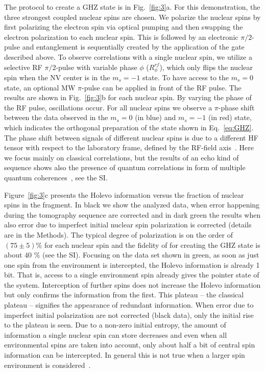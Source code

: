 \documentclass[aps,prl,floatfix,twocolumn,footinbib,superscriptaddress]{revtex4-1}
\begin{document}
The protocol to create a GHZ state is in Fig.~\ref{fig:3}a. For this demonstration, the three strongest coupled nuclear spins are chosen. We polarize the nuclear spins by first polarizing the electron spin via optical pumping and then swapping the electron polarization to each nuclear spin. This is followed by an electronic $\pi/2$-pulse and entanglement is sequentially created by the application of the gate described above. To observe correlations with a single nuclear spin, we utilize a selective RF $\pi/2$-pulse with variable phase $\phi$ ($R^{rf}_\phi$), which only flips the nuclear spin when the NV center is in the $m_s = -1$ state. To have access to the $m_s=0$ state, an optional MW $\pi$-pulse can be applied in front of the RF pulse. The results are shown in Fig.~\ref{fig:3}b for each nuclear spin. By varying the phase of the RF pulse, oscillations occur. For all nuclear spins we observe a $\pi$-phase shift between the data observed in the $m_s = 0$ (in blue) and $m_s = -1$ (in red) state, which indicates the orthogonal preparation of the state shown in Eq.~\eqref{eq:GHZ}. The phase shift between signals of different nuclear spins is due to a different HF tensor with respect to the laboratory frame, defined by the RF-field axis~\cite{Laraoui15}. Here we focus mainly on classical correlations, but the results of an echo kind of sequence shows also the presence of quantum correlations in form of multiple quantum coherences~\cite{Baum85,Gaerttner17}, see the SI.  

Figure~\ref{fig:3}c presents the Holevo information versus the fraction of nuclear spins in the fragment. In black we show the analyzed data, when error happening during the tomography sequence are corrected and in dark green the results when also error due to imperfect initial nuclear spin polarization is corrected (details are in the Methods). The typical degree of polarization is on the order of $(75\pm 5) \%$ for each nuclear spin and the fidelity of for creating the GHZ state is about $40$ \% (see the SI). Focusing on the data set shown in green, as soon as just one spin from the environment is intercepted, the Holevo information is already 1 bit. That is, access to a single environment spin already gives the pointer state of the system. Interception of further spins does not increase the Holevo information but only confirms the information from the first. This plateau -- the classical plateau -- signifies the appearance of redundant information. When error due to imperfect initial polarization are not corrected (black data), only the initial rise to the plateau is seen. Due to a non-zero initial entropy, the amount of information a single nuclear spin can store decreases and even when all environmental spins are taken into account, only about half a bit of central spin information can be intercepted. In general this is not true when a larger spin environment is considered~\cite{Zwolak09,Zwolak10-1}. 
\end{document}
